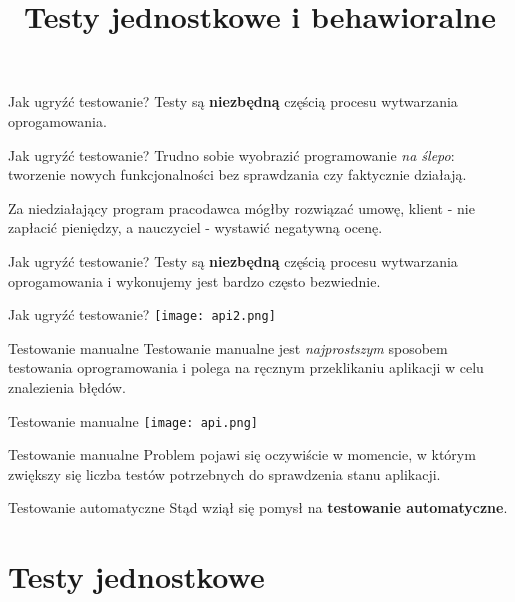

\title{Testy jednostkowe i behawioralne}



\begin{frame}{Jak ugryźć testowanie?}
	Testy są \textbf{niezbędną} częścią procesu wytwarzania oprogamowania.
\end{frame}

\begin{frame}{Jak ugryźć testowanie?}
	Trudno sobie wyobrazić programowanie \emph{na ślepo}: tworzenie nowych funkcjonalności bez sprawdzania czy faktycznie działają.
	
	Za niedziałający program pracodawca mógłby rozwiązać umowę, klient - nie zapłacić pieniędzy, a nauczyciel - wystawić negatywną ocenę.
\end{frame}

\begin{frame}{Jak ugryźć testowanie?}
	Testy są \textbf{niezbędną} częścią procesu wytwarzania oprogamowania i wykonujemy jest bardzo często bezwiednie.
\end{frame}

\begin{frame}{Jak ugryźć testowanie?}
	\centering
	\texttt{[image: api2.png]}
\end{frame}

\begin{frame}{Testowanie manualne}
	Testowanie manualne jest \emph{najprostszym} sposobem testowania oprogramowania i polega na ręcznym przeklikaniu aplikacji w celu znalezienia błędów.
\end{frame}

\begin{frame}{Testowanie manualne}
	\centering
	\texttt{[image: api.png]}
\end{frame}

\begin{frame}{Testowanie manualne}
	Problem pojawi się oczywiście w momencie, w którym zwiększy się liczba testów potrzebnych do sprawdzenia stanu aplikacji.
\end{frame}

\begin{frame}{Testowanie automatyczne}
	Stąd wziął się pomysł na \textbf{testowanie automatyczne}.
\end{frame}

\section{Testy jednostkowe}

